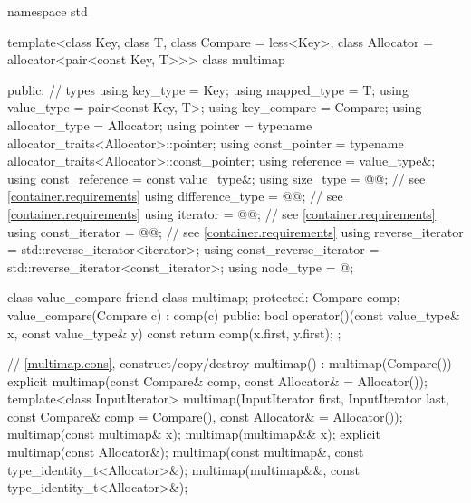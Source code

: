 \documentclass{wg21}
\begin{document}
\pnum
[...] 
\begin{codeblock}
namespace std {
template<class Key, class T, class Compare = less<Key>,
class Allocator = allocator<pair<const Key, T>>>
class multimap {
    public:
    // types
    using key_type               = Key;
    using mapped_type            = T;
    using value_type             = pair<const Key, T>;
    using key_compare            = Compare;
    using allocator_type         = Allocator;
    using pointer                = typename allocator_traits<Allocator>::pointer;
    using const_pointer          = typename allocator_traits<Allocator>::const_pointer;
    using reference              = value_type&;
    using const_reference        = const value_type&;
    using size_type              = @@; // see \ref{container.requirements}
    using difference_type        = @@; // see \ref{container.requirements}
    using iterator               = @@; // see \ref{container.requirements}
    using const_iterator         = @@; // see \ref{container.requirements}
    using reverse_iterator       = std::reverse_iterator<iterator>;
    using const_reverse_iterator = std::reverse_iterator<const_iterator>;
    using node_type              = @\unspec@;
    
    class value_compare {
        friend class multimap;
        protected:
        Compare comp;
        value_compare(Compare c) : comp(c) { }
        public:
        bool operator()(const value_type& x, const value_type& y) const {
            return comp(x.first, y.first);
        }
    };
    
    // \ref{multimap.cons}, construct/copy/destroy
    multimap() : multimap(Compare()) { }
    explicit multimap(const Compare& comp, const Allocator& = Allocator());
    template<class InputIterator>
    multimap(InputIterator first, InputIterator last,
    const Compare& comp = Compare(),
    const Allocator& = Allocator());
    multimap(const multimap& x);
    multimap(multimap&& x);
    explicit multimap(const Allocator&);
    multimap(const multimap&, const type_identity_t<Allocator>&);
    multimap(multimap&&, const type_identity_t<Allocator>&);
    
}}
\end{codeblock}
\end{document}
